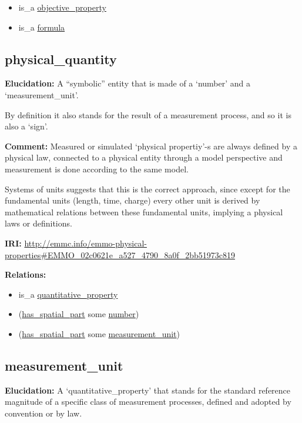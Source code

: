 \documentclass[a4paper,]{report}
\providecommand{\tightlist}{%
  \setlength{\itemsep}{0pt}\setlength{\parskip}{0pt}}
\begin{document}
\begin{itemize}
\tightlist
\item
  is\_a \protect\hyperlink{objective_property}{objective\_property}
\item
  is\_a \protect\hyperlink{formula}{formula}
\end{itemize}

\hypertarget{physical_quantity}{%
\subsection{physical\_quantity}\label{physical_quantity}}

\textbf{Elucidation:} A ``symbolic'' entity that is made of a `number'
and a `measurement\_unit'.

By definition it also stands for the result of a measurement process,
and so it is also a `sign'.

\textbf{Comment:} Measured or simulated `physical propertiy'-s are
always defined by a physical law, connected to a physical entity through
a model perspective and measurement is done according to the same model.

Systems of units suggests that this is the correct approach, since
except for the fundamental units (length, time, charge) every other unit
is derived by mathematical relations between these fundamental units,
implying a physical laws or definitions.

\textbf{IRI:}
\url{http://emmc.info/emmo-physical-properties\#EMMO_02c0621e_a527_4790_8a0f_2bb51973c819}

\textbf{Relations:}

\begin{itemize}
\tightlist
\item
  is\_a
  \protect\hyperlink{quantitative_property}{quantitative\_property}
\item
  (\protect\hyperlink{has_spatial_part}{has\_spatial\_part} some
  \protect\hyperlink{number}{number})
\item
  (\protect\hyperlink{has_spatial_part}{has\_spatial\_part} some
  \protect\hyperlink{measurement_unit}{measurement\_unit})
\end{itemize}

\hypertarget{measurement_unit}{%
\subsection{measurement\_unit}\label{measurement_unit}}

\textbf{Elucidation:} A `quantitative\_property' that stands for the
standard reference magnitude of a specific class of measurement
processes, defined and adopted by convention or by law.
\end{document}
